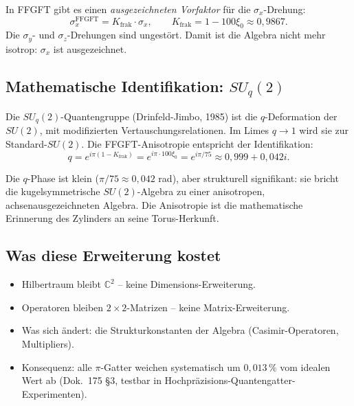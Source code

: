 In FFGFT gibt es einen \emph{ausgezeichneten Vorfaktor} für die
$\sigma_x$-Drehung:
\begin{equation}
  \sigma_x^{\text{FFGFT}} = K_{\text{frak}} \cdot \sigma_x,
  \qquad
  K_{\text{frak}} = 1 - 100\xi_0 \approx 0{,}9867.
\end{equation}
Die $\sigma_y$- und $\sigma_z$-Drehungen sind ungestört. Damit ist
die Algebra nicht mehr isotrop: $\sigma_x$ ist ausgezeichnet.

\subsection{Mathematische Identifikation: $SU_q(2)$}

Die $SU_q(2)$-Quantengruppe (Drinfeld-Jimbo, 1985) ist die
$q$-Deformation der $SU(2)$, mit modifizierten Vertauschungsrelationen.
Im Limes $q \to 1$ wird sie zur Standard-$SU(2)$. Die FFGFT-Anisotropie
entspricht der Identifikation:
\begin{equation}
  \boxed{
    q = e^{i\pi(1 - K_{\text{frak}})}
      = e^{i\pi \cdot 100\xi_0}
      = e^{i\pi/75}
      \approx 0{,}999 + 0{,}042i.
  }
\end{equation}

Die $q$-Phase ist klein ($\pi/75 \approx 0{,}042$ rad), aber
strukturell signifikant: sie bricht die kugelsymmetrische
$SU(2)$-Algebra zu einer anisotropen, achsenausgezeichneten Algebra.
Die Anisotropie ist die mathematische Erinnerung des Zylinders an
seine Torus-Herkunft.

\subsection{Was diese Erweiterung kostet}

\begin{itemize}[leftmargin=2em,itemsep=2pt,topsep=2pt]
  \item Hilbertraum bleibt $\mathbb{C}^2$ -- keine Dimensions-Erweiterung.
  \item Operatoren bleiben $2\times 2$-Matrizen -- keine
        Matrix-Erweiterung.
  \item Was sich ändert: die Strukturkonstanten der Algebra
        (Casimir-Operatoren, Multipliers).
  \item Konsequenz: alle $\pi$-Gatter weichen systematisch um
        $0{,}013\,\%$ vom idealen Wert ab (Dok.~175 §3, testbar in
        Hochpräzisions-Quantengatter-Experimenten).
\end{itemize}

